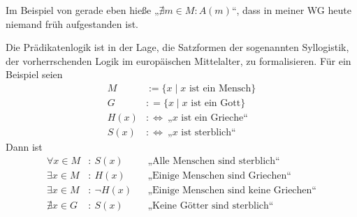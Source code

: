 \begin{bsp}
    Im Beispiel von gerade eben hieße „$\nexists m\in M: A(m)$“, dass in meiner WG heute niemand früh aufgestanden ist.
\end{bsp}


\begin{bsp}[Syllogistik]
    Die Prädikatenlogik ist in der Lage, die Satzformen der sogenannten Syllogistik, der vorherrschenden Logik im europäischen Mittelalter, zu formalisieren. Für ein Beispiel seien
    \begin{align*}
        M & := \{ x\mid  \text{$x$ ist ein Mensch} \} \\
        G &  : = \{x\mid \text{$x$ ist ein Gott} \} \\
        H(x) & :\Leftrightarrow\ \text{„$x$ ist ein Grieche“} \\
        S(x) & :\Leftrightarrow\ \text{„$x$ ist sterblich“}
    \end{align*}
    Dann ist
    \begin{align*}
        \forall x\in M& :\ S(x) && \text{„Alle Menschen sind sterblich“} \\
        \exists x \in M & :\ H(x)&& \text{„Einige Menschen sind Griechen“} \\
        \exists x \in M& :\ \neg H(x) && \text{„Einige Menschen sind keine Griechen“} \\
        \nexists x\in G & :\ S(x)&& \text{„Keine Götter sind sterblich“}
    \end{align*}
\end{bsp}


